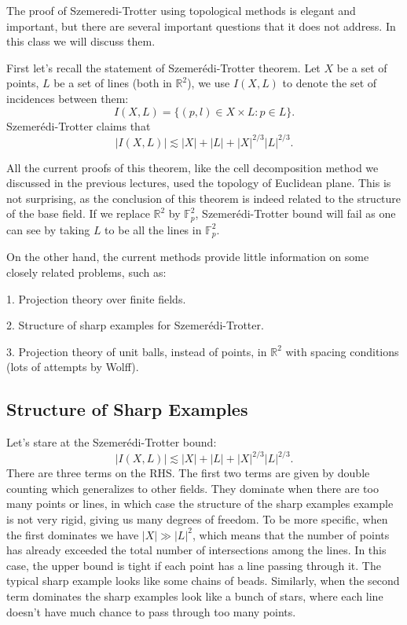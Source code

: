 \documentclass[12pt]{amsart}
\begin{document}
The proof of Szemeredi-Trotter using topological methods is elegant and important,  but there are several important questions that it does not address.  In this class we will discuss them.   



First let's recall the statement of Szemer\'edi-Trotter theorem. Let $X$ be a set of points, $L$ be a set of lines (both in $\mathbb{R}^2$), we use $I(X,L)$ to denote the set of incidences between them:
\begin{equation*}
    I(X,L) = \{(p,l) \in X \times L: p \in L\}.
\end{equation*}
Szemer\'edi-Trotter claims that 
\begin{equation*}
    |I(X,L)| \lesssim |X| + |L| + |X|^{2/3} |L|^{2/3}.
\end{equation*}

All the current proofs of this theorem, like the cell decomposition method we discussed in the previous lectures, used the topology of Euclidean plane. This is not surprising, as the conclusion of this theorem is indeed related to the structure of the base field. If we replace $\mathbb{R}^2$ by $\mathbb{F}_p^2$, Szemer\'edi-Trotter bound will fail as one can see by taking $L$ to be all the lines in $\mathbb{F}_p^2$. 

On the other hand, the current methods provide little information on some closely related problems, such as:

1. Projection theory over finite fields. 

2. Structure of sharp examples for Szemer\'edi-Trotter. 

3. Projection theory of unit balls, instead of points, in $\mathbb{R}^2$ with spacing conditions (lots of attempts by Wolff). 

\subsection*{Structure of Sharp Examples}

Let's stare at the Szemer\'edi-Trotter bound:
\begin{equation*}
    |I(X,L)| \lesssim |X| + |L| + |X|^{2/3} |L|^{2/3}.
\end{equation*}
There are three terms on the RHS. The first two terms are given by double counting which generalizes to other fields. They dominate when there are too many points or lines, in which case the structure of the sharp examples example is not very rigid, giving us many degrees of freedom.  To be more specific, when the first dominates we have $|X| \gg |L|^2$, which means that the number of points has already exceeded the total number of intersections among the lines. In this case, the upper bound is tight if each point has a line passing through it. The typical sharp example looks like some chains of beads. Similarly, when the second term dominates the sharp examples look like a bunch of stars, where each line doesn't have much chance to pass through too many points.
\end{document}
